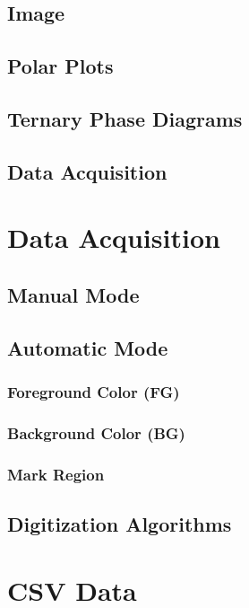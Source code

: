 \documentclass[letterpaper]{article}
\begin{document}
\subsection{Image}
\subsection{Polar Plots}
\subsection{Ternary Phase Diagrams}
\subsection{Data Acquisition}
\section{Data Acquisition}
\subsection{Manual Mode}
\subsection{Automatic Mode}
\subsubsection{Foreground Color (FG)}
\subsubsection{Background Color (BG)}
\subsubsection{Mark Region}
\subsection{Digitization Algorithms}
\section{CSV Data}
\end{document}
